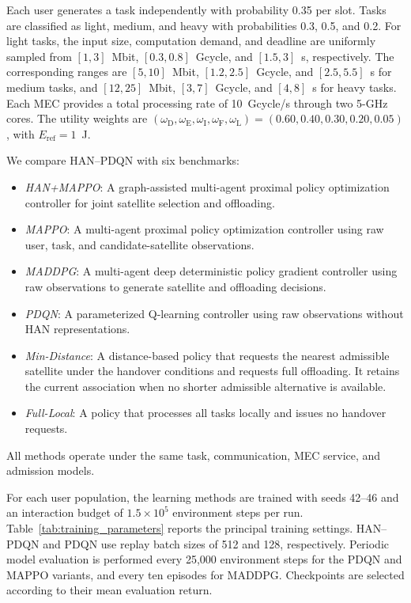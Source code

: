 Each user generates a task independently with probability
0.35 per slot. Tasks are classified as light, medium,
and heavy with probabilities 0.3, 0.5, and 0.2.
For light tasks, the input size, computation demand,
and deadline are uniformly sampled from
$[1,3]$~Mbit, $[0.3,0.8]$~Gcycle, and $[1.5,3]$~s,
respectively. The corresponding ranges are
$[5,10]$~Mbit, $[1.2,2.5]$~Gcycle, and $[2.5,5.5]$~s
for medium tasks, and
$[12,25]$~Mbit, $[3,7]$~Gcycle, and $[4,8]$~s
for heavy tasks.
Each MEC provides a total processing rate of
10~Gcycle/s through two 5-GHz cores.
The utility weights are
$(\omega_{\mathrm D},\omega_{\mathrm E},
\omega_{\mathrm I},\omega_{\mathrm F},\omega_{\mathrm L})
=(0.60,0.40,0.30,0.20,0.05)$,
with $E_{\mathrm{ref}}=1$~J.

We compare HAN--PDQN with six benchmarks:
\begin{itemize}
    \item \textit{HAN+MAPPO}: A graph-assisted multi-agent
    proximal policy optimization controller for joint
    satellite selection and offloading.

    \item \textit{MAPPO}: A multi-agent proximal policy
    optimization controller using raw user, task, and
    candidate-satellite observations.

    \item \textit{MADDPG}: A multi-agent deep deterministic
    policy gradient controller using raw observations
    to generate satellite and offloading decisions.

    \item \textit{PDQN}: A parameterized Q-learning
    controller using raw observations without HAN
    representations.

    \item \textit{Min-Distance}: A distance-based policy
    that requests the nearest admissible satellite
    under the handover conditions and requests full
    offloading. It retains the current association
    when no shorter admissible alternative is available.

    \item \textit{Full-Local}: A policy that processes
    all tasks locally and issues no handover requests.
\end{itemize}
All methods operate under the same task, communication,
MEC service, and admission models.

For each user population, the learning methods are trained
with seeds 42--46 and an interaction budget of
$1.5\times10^5$ environment steps per run.
Table~\ref{tab:training_parameters} reports the principal
training settings.
HAN--PDQN and PDQN use replay batch sizes of 512 and 128,
respectively. Periodic model evaluation is performed
every 25,000 environment steps for the PDQN and MAPPO
variants, and every ten episodes for MADDPG.
Checkpoints are selected according to their mean
evaluation return.

